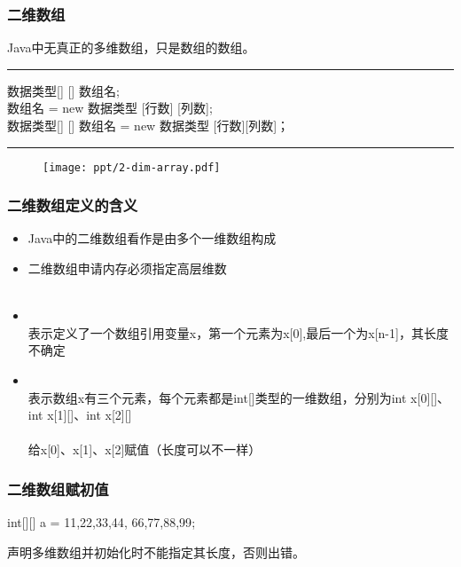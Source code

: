 \begin{frame}[fragile]
  \frametitle{二维数组}

  Java中无真正的多维数组，只是数组的数组。


  \rule[0pt]{10cm}{0.05em}

  {\kai 数据类型[] [] 数组名;\\
  数组名 = new 数据类型 [行数] [列数];\\
  数据类型[] [] 数组名 = new 数据类型 [行数][列数]；
  }
  
  \rule[0pt]{10cm}{0.05em}

  \begin{figure}
    \centering
    \texttt{[image: ppt/2-dim-array.pdf]}
  \end{figure}
\end{frame}

\begin{frame}[fragile]
  \frametitle{二维数组定义的含义}
  \begin{itemize}[<+-| structure@+>]
  \item Java中的二维数组看作是由多个一维数组构成
  \item 二维数组申请内存必须指定{\Red 高层维数}\\
    \\
  \item {}\\
    {\kai\Blue 表示定义了一个数组引用变量x，第一个元素为x[0],最后一个为x[n-1]，其长度不确定}
  \item {}\\
    {\kai\Blue 表示数组x有三个元素，每个元素都是int[]类型的一维数组，分别为int x[0][]、int x[1][]、int x[2][]}\\
    \\
    {\kai\Blue 给x[0]、x[1]、x[2]赋值（长度可以不一样）}
  \end{itemize}
\end{frame}

\begin{frame}[fragile]
  \frametitle{二维数组赋初值}

  \begin{javaCode}
    int[][] a = {{11,22,33,44}, {66,77,88,99}};    
  \end{javaCode}


  声明多维数组并初始化时不能指定其长度，否则出错。


\end{frame}

